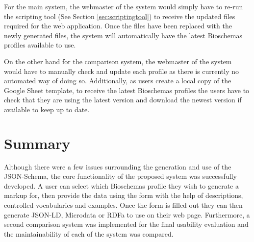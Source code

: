 For the main system, the webmaster of the system would simply have to re-run the scripting tool (See Section \ref{sec:scriptingtool}) to receive the updated files required for the web application. Once the files have been replaced with the newly generated files, the system will automatically have the latest Bioschemas profiles available to use.

On the other hand for the comparison system, the webmaster of the system would have to manually check and update each profile as there is currently no automated way of doing so. Additionally, as users create a local copy of the Google Sheet template, to receive the latest Bioschemas profiles the users have to check that they are using the latest version and download the newest version if available to keep up to date.


\section{Summary}
Although there were a few issues surrounding the generation and use of the JSON-Schema, the core functionality of the proposed system was successfully developed. A user can select which Bioschemas profile they wish to generate a markup for, then provide the data using the form with the help of descriptions, controlled vocabularies and examples. Once the form is filled out they can then generate JSON-LD, Microdata or RDFa to use on their web page. Furthermore, a second comparison system was implemented for the final usability evaluation and the maintainability of each of the system was compared.
